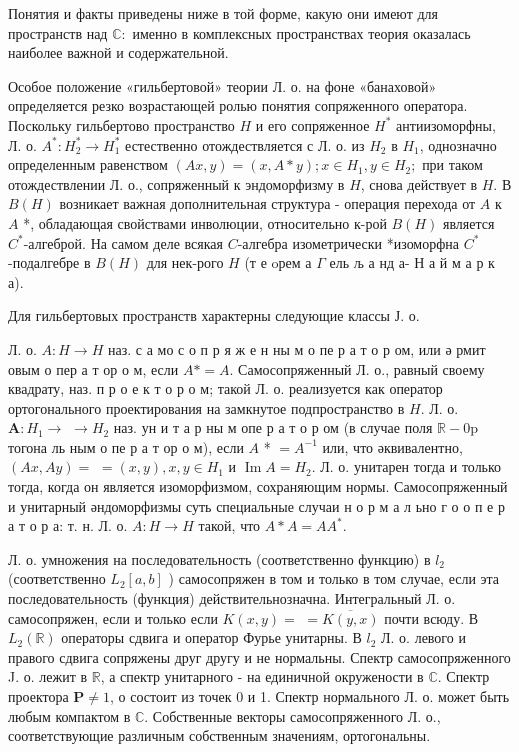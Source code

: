\documentclass[10pt]{article}
\begin{document}
Понятия и факты приведены ниже в той форме, какую они имеют для пространств над $\mathbb{C}:$ именно в комплексных пространствах теория оказалась наиболее важной и содержательной.



Особое положение «гильбертовой» теории Л. о. на фоне «банаховой» определяется резко возрастающей ролью понятия сопряженного оператора. Поскольку гильбертово пространство $H$ и его сопряженное $H^{*}$ антиизоморфны, Л. о. $A^{*}: H_{2}^{*} \rightarrow H_{1}^{*}$ естественно отождествляется с Л. о. из $H_{2}$ в $H_{1}$, однозначно определенным равенством $(A x, y)=(x, A * y) ; x \in H_{1}, y \in H_{2} ;$ при таком отождествлении Л. о., сопряженный к эндоморфизму в $H$, снова действует в $H$. В $B(H)$ возникает важная дополнительная структура - операция перехода от $A$ к $A$ *, обладающая свойствами инволюции, относительно к-рой $B(H)$ является $C^{*}$-алгеброй. На самом деле всякая $C$-алгебра изометрически *изоморфна $C^{*}$-подалгебре в $B(H)$ для нек-рого $H$ (т е oрем а $\Gamma$ ель љ а нд а- Н а й м а р к а).



Для гильбертовых пространств характерны следующие классы Ј. о.



Л. о. $A: H \rightarrow H$ наз. с а мо с о п р я ж е н ны м о пе р а т о р ом, или ә рмит овым о пер а т ор о м, если $A *=A$. Самосопряженный Л. о., равный своему квадрату, наз. п р о е к т о р о м; такой Л. о. реализуется как оператор ортогонального проектирования на замкнутое подпространство в $H$. Л. о. $\boldsymbol{A}: H_{1} \rightarrow$ $\rightarrow H_{2}$ наз. ун и т а р ны м опе р а т о р ом (в случае поля $\mathbb{R}-0 \mathrm{p}$ тогона ль ным о пе р а т ор о м), если $A$ * $=A^{-1}$ или, что әквивалентно, $(A x, A y)=$ $=(x, y), x, y \in H_{1}$ и $\operatorname{Im} A=H_{2}$. Л. о. унитарен тогда и только тогда, когда он является изоморфизмом, сохраняющим нормы. Самосопряженный и унитарный әндоморфизмы суть специальные случаи н о р м а л ьно г о о п е р а т о р а: т. н. Л. о. $A: H \rightarrow H$ такой, что $A * A=A A^{*}$.



Л. о. умножения на последовательность (соответственно функцию) в $l_{2}$ (соответственно $L_{2}[a, b]$ ) самосопряжен в том и только в том случае, если эта последовательность (функция) действительнозначна. Интегральный Л. о. самосопряжен, если и только если $K(x, y)=$ $=\overline{K(y, x)}$ почти всюду. В $L_{2}(\mathbb{R})$ операторы сдвига и оператор Фурье унитарны. В $l_{2}$ Л. о. левого и правого сдвига сопряжены друг другу и не нормальны. Спектр самосопряженного J. о. лежит в $\mathbb{R}$, а спектр унитарного - на единичной окружености в $\mathbb{C}$. Спектр проектора $\boldsymbol{P} \neq 1$, о состоит из точек 0 и 1. Спектр нормального Л. о. может быть любым компактом в $\mathbb{C}$. Собственные векторы самосопряженного Л. о., соответствующие различным собственным значениям, ортогональны.
\end{document}
